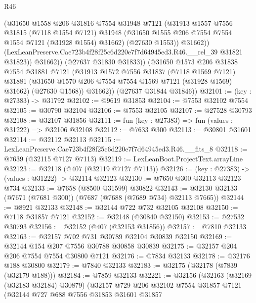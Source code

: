 \begin{lexlean}{R46}
\begin{coremodule}
                  (@31650
                    @1558
                    @206
                    @31816
                    @7554
                    @31948
                    @7121
                    (@31913
                      @1557
                      @7556
                      @31815
                      (@7118 @1554 @7121)
                      @31948
                      (@31650 @1555 @206 @7554 @7554 @1554 @7121 (@31928 @1554) @31662)
                      (@27630 @1553))
                    @31662))
                (LexLeanPreserve.Cae723b4f28f25c6d220e7f7d64945ed3.R46.__rel_39 @31821 @31823))
              @31662))
          (@27637 @31830 @31833))
        (@31650
          @1573
          @206
          @31838
          @7554
          @31881
          @7121
          (@31913
            @1572
            @7556
            @31837
            (@7118 @1569 @7121)
            @31881
            (@31650 @1570 @206 @7554 @7554 @1569 @7121 (@31928 @1569) @31662)
            (@27630 @1568))
          @31662))
      (@27637 @31844 @31846))
@32101 := (key : @27383) -> @31792
@32102 := @9619 @31853
@32104 := @7553 @32102 @7554
@32105 := @30790 @32104
@32106 := @7553 @32105
@32107 := @27528 @30793
@32108 := @32107 @31856
@32111 := fun (key : @27383) => fun (values : @31222) => @32106 @32108
@32112 := @7633 @300
@32113 := @30801 @31601
@32114 := @32112 @32113
@32115 := LexLeanPreserve.Cae723b4f28f25c6d220e7f7d64945ed3.R46.__fits_8
@32118 := @7639 (@32115 @7127 @7113)
@32119 := LexLeanBoot.ProjectText.arrayLine
@32123 := @32118 (@407 (@32119 @7127 @7113))
@32126 := (key : @27383) -> (values : @31222) -> @32114 @32123
@32130 := @7650 @300 @32113 @32123 @734
@32133 := @7658 (@8500 @31599) @30822
@32143 := @32130 @32133 (@7671 (@7681 @300)) (@7687 (@7688 (@7689 @734) @32113 @7665))
@32144 := @8921 @32133
@32148 := @32144 @722 @732 @32105 @32108
@32150 := @7118 @31857 @7121
@32152 := @32148 (@30840 @32150)
@32153 := @27532 @30793
@32156 := @32152 (@407 (@32153 @31856))
@32157 := @7810 @32133
@32163 := @32157 @702 @731 @30789 @32104 @30839 @32150
@32169 := @32144 @154 @207 @7556 @30788 @30858 @30839
@32175 := @32157 @204 @206 @7554 @7554 @30800 @7121
@32176 := @7834 @32133
@32178 := @32176 @188 @30800
@32179 := @7840 @32133
@32183 := @32175 (@32178 (@7839 (@32179 @188)))
@32184 := @7859 @32133
@32221 := @32156
    (@32163
      (@32169 (@32183 @32184) @30879)
      (@32157
        @729
        @206
        @32102
        @7554
        @31857
        @7121
        (@32144
          @727
          @688
          @7556
          @31853
          @31601
          @31857

\end{coremodule}
\end{lexlean}
